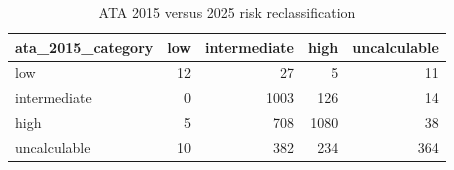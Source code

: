 \begin{table}[htbp]
\centering
\caption{ATA 2015 versus 2025 risk reclassification}
\label{tab:m036\_ata\_reclassification}
\begin{tabular}{lrrrr}
\toprule
ata\_2015\_category & low & intermediate & high & uncalculable \\
\midrule
low & 12 & 27 & 5 & 11 \\
intermediate & 0 & 1003 & 126 & 14 \\
high & 5 & 708 & 1080 & 38 \\
uncalculable & 10 & 382 & 234 & 364 \\
\bottomrule
\end{tabular}
\end{table}
